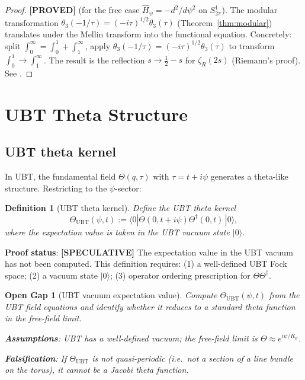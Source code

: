 \documentclass[11pt,a4paper]{article}
\newtheorem{definition}{Definition}
\newtheorem{gap}{Open Gap}
\newcommand{\proved}[1]{\textbf{[PROVED]} #1}
\newcommand{\speculative}[1]{\textbf{[SPECULATIVE]} #1}
\begin{document}
\begin{proof}
  \proved{} (for the free case $\hat{H}_\psi = -d^2/d\psi^2$ on $S^1_{2\pi}$).
  The modular transformation $\theta_3(-1/\tau) = (-i\tau)^{1/2}\theta_3(\tau)$
  (Theorem~\ref{thm:modular}) translates under the Mellin transform into the
  functional equation.  Concretely: split $\int_0^\infty = \int_0^1 + \int_1^\infty$,
  apply $\theta_3(-1/\tau) = (-i\tau)^{1/2}\theta_3(\tau)$ to transform
  $\int_0^1 \to \int_1^\infty$.  The result is the reflection $s \to \frac12 - s$
  for $\zeta_R(2s)$ (Riemann's proof).  See \cite[Ch.\ 2]{Davenport}.
\end{proof}

\section{UBT Theta Structure}

\subsection{UBT theta kernel}

In UBT, the fundamental field $\Theta(q,\tau)$ with $\tau = t + i\psi$ generates
a theta-like structure.  Restricting to the $\psi$-sector:

\begin{definition}[UBT theta kernel]
  \label{def:ubttheta}
  Define the UBT theta kernel
  \[
    \Theta_\mathrm{UBT}(\psi, t) := \langle 0|\Theta(0, t+i\psi)\Theta^\dagger(0,t)\,|0\rangle,
  \]
  where the expectation value is taken in the UBT vacuum state $|0\rangle$.
\end{definition}

\textbf{Proof status}: \speculative{The expectation value in the UBT vacuum
has not been computed.  This definition requires:
(1) a well-defined UBT Fock space;
(2) a vacuum state $|0\rangle$;
(3) operator ordering prescription for $\Theta\Theta^\dagger$.}

\begin{gap}[UBT vacuum expectation value]
  \label{gap:vev}
  Compute $\Theta_\mathrm{UBT}(\psi, t)$ from the UBT field equations and
  identify whether it reduces to a standard theta function in the free-field limit.

  \textbf{Assumptions}: UBT has a well-defined vacuum; the free-field limit
  is $\Theta \approx e^{i\psi/R_\psi}$.

  \textbf{Falsification}: If $\Theta_\mathrm{UBT}$ is not quasi-periodic
  (i.e.\ not a section of a line bundle on the torus), it cannot be a
  Jacobi theta function.
\end{gap}
\end{document}
